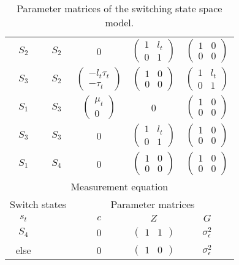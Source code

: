 \documentclass[12pt]{article}
\begin{document}
\begin{table}[h!]
\begin{tabular}[h!]{cc|ccc}
  $S_2$ & $S_2$ & 0 & $\begin{pmatrix} 1 & l_t \\ 0 & 1 \end{pmatrix}$ 
        & $\begin{pmatrix}1&0\\0&0\end{pmatrix}$\\
  $S_3$ & $S_2$ & $\begin{pmatrix} -l_t\tau_t\\ -\tau_t\end{pmatrix}$ 
                                    & $\begin{pmatrix} 1 & 0 \\ 0 &
                                      0 \end{pmatrix}$ 
          & $\begin{pmatrix} 1 & l_t\\ 0 & 1 \end{pmatrix}$\\
  $S_1$ & $S_3$ & $\begin{pmatrix} \mu_t\\0\end{pmatrix}$ & 0
          & $\begin{pmatrix} 1 & 0\\ 0 & 0 \end{pmatrix}$\\
  $S_3$ & $S_3$ & 0& $\begin{pmatrix} 1 & l_t \\ 0 & 1 \end{pmatrix}$ 
        & $\begin{pmatrix}1&0\\0&0\end{pmatrix}$\\
  $S_1$ &  $S_4$ & 0 & $\begin{pmatrix}1&0\\0&0\end{pmatrix}$ 
        & $\begin{pmatrix}1&0\\0&0\end{pmatrix}$\\
  \hline\hline
  \multicolumn{5}{c}{Measurement equation}\\
  \hline
  \multicolumn{2}{c|}{Switch states} & \multicolumn{3}{c}{Parameter
                                      matrices}\\
  $s_t$ && $c$ & $Z$ & $G$\\
  \hline
  $S_4$ & & 0 & $\begin{pmatrix} 1 & 1 \end{pmatrix}$ &
                                                                  $\sigma^2_\epsilon$\\
  else && 0 & $\begin{pmatrix} 1 & 0 \end{pmatrix}$ &
                                                                  $\sigma^2_\epsilon$\\
  \hline\hline
\end{tabular}
\caption{Parameter matrices of the switching state space model.\label{tab:parmats}}
\end{table}
\end{document}

